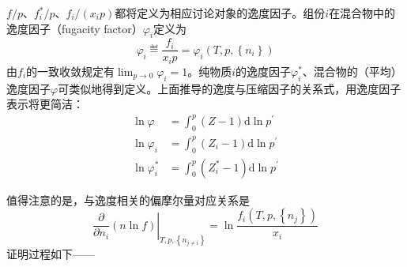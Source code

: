 \documentclass[main.tex]{subfiles}
\begin{document}
$f/p$、$f_i^*/p$、$f_i/\left(x_ip\right)$都将定义为相应讨论对象的逸度因子。组份$i$在混合物中的逸度因子（fugacity factor）$\varphi_i$定义为
\begin{equation}\label{eq:II.4_def_fugacity_factor_i}
    \varphi_i\eqdef\frac{f_i}{x_ip}=\varphi_i\left(T,p,\left\{n_i\right\}\right)
\end{equation}
由$f_i$的一致收敛规定有$\lim_{p\to 0}\varphi_i=1$。纯物质$i$的逸度因子$\varphi_i^*$、混合物的（平均）逸度因子$\varphi$可类似地得到定义。上面推导的逸度与压缩因子的关系式，用逸度因子表示将更简洁：
\begin{align*}
    \ln\varphi     & =\int_0^p\left(Z-1\right)\mathrm{d}\ln p^\prime     \\
    \ln\varphi_i   & =\int_0^p\left(Z_i-1\right)\mathrm{d}\ln p^\prime   \\
    \ln\varphi^*_i & =\int_0^p\left(Z_i^*-1\right)\mathrm{d}\ln p^\prime
\end{align*}

值得注意的是，与逸度相关的偏摩尔量对应关系是
\[\left.\frac{\partial}{\partial n_i}\left(n\ln f\right)\right|_{T,p,\left\{n_{j\neq i}\right\}}=\ln\frac{f_i\left(T,p,\left\{n_j\right\}\right)}{x_i}\]
证明过程如下——
\end{document}
